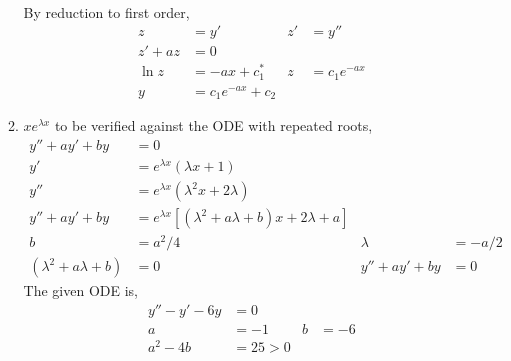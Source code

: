 \begin{enumerate}
\begin{enumerate}
\begin{align}
                    \end{align}
                    By reduction to first order,
                    \begin{align}
                        z       & = y'                   & z' & = y''          \\
                        z' + az & = 0                                          \\
                        \ln z   & = -ax + c_{1}^{*}      & z  & = c_{1}e^{-ax} \\
                        y       & = c_{1}e^{-ax} + c_{2}
                    \end{align}

              \item $ xe^{\lambda x} $ to be verified against the ODE with repeated
                    roots,
                    \begin{align}
                        y'' + ay' + by & = 0                                    \\
                        y'             & = e^{\lambda x} (\lambda x + 1)        \\
                        y''            & = e^{\lambda x}(\lambda ^{2}x
                        + 2\lambda)                                             \\
                        y'' + ay' + by & = e^{\lambda x} \left[ (\lambda ^{2}
                        + a\lambda + b)x + 2\lambda + a \right]                 \\
                        b              & = a^{2}/4                            &
                        \lambda        & = -a/2                                 \\
                        (\lambda ^{2} + a\lambda + b)
                                       & = 0                                  &
                        y'' + ay' + by & = 0
                    \end{align}
                    The given ODE is,
                    \begin{align}
                        y'' - y' - 6y            & = 0                            \\
                        a                        & = -1                         &
                        b                        & = -6                           \\
                        a^{2} - 4b               & = 25 > 0                       \\

\end{align}
\end{enumerate}
\end{enumerate}
